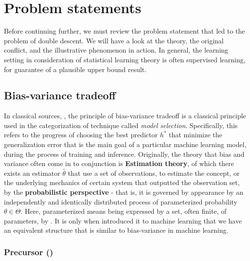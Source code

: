 \documentclass[
  journal=largetwo,
  year=2025,
  volume=37,
]{cup-journal}
\begin{document}
\section{Problem statements}

Before continuing further, we must review the problem statement that led to the problem of double descent. We will have a look at the theory, the original conflict, and the illustrative phenomenon in action. In general, the learning setting in consideration of statistical learning theory is often supervised learning, for guarantee of a plausible upper bound result. 

\subsection{Bias-variance tradeoff}

In classical sources, \cite{James2021,goodfellow2016deep,STL_Hajek_Maxim_2021,10.5555/2371238,10.5555/2621980}, the principle of bias-variance tradeoff is a classical principle used in the categorization of technique called \textit{model selection}. Specifically, this refers to the progress of choosing the best predictor $h^{*}$ that minimize the generalization error that is the main goal of a particular machine learning model, during the process of training and inference. Originally, the theory that bias and variance often come in to conjunction is \textbf{Estimation theory}, of which there exists an estimator $\hat{\theta}$ that use a set of observations, to estimate the concept, or the underlying mechanics of certain system that outputted the observation set, by the \textbf{probabilistic perspective} - that is, it is governed by appearance by an independently and identically distributed process of parameterized probability $\theta\in \Theta$. Here, parameterized means being expressed by a set, often finite, of parameters, by \cite{LehmannCasella_theory_1998,liam_statistics_2005}. It is only when \cite{6797087} introduced it to machine learning that we have an equivalent structure that is similar to bias-variance in machine learning. 

\subsubsection{Precursor (\cite{6797087})}
\end{document}
